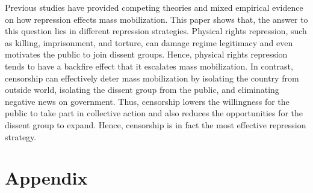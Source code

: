 \documentclass[11pt,]{article}
\begin{document}
Previous studies have provided competing theories and mixed empirical
evidence on how repression effects mass mobilization. This paper shows
that, the answer to this question lies in different repression
strategies. Physical rights repression, such as killing, imprisonment,
and torture, can damage regime legitimacy and even motivates the public
to join dissent groups. Hence, physical rights repression tends to have
a backfire effect that it escalates mass mobilization. In contrast,
censorship can effectively deter mass mobilization by isolating the
country from outside world, isolating the dissent group from the public,
and eliminating negative news on government. Thus, censorship lowers the
willingness for the public to take part in collective action and also
reduces the opportunities for the dissent group to expand. Hence,
censorship is in fact the most effective repression strategy.

\section{Appendix}
\end{document}
